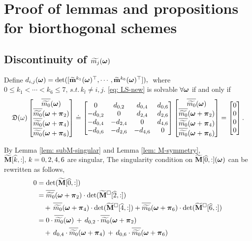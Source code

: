 \section{Proof of lemmas and propositions for biorthogonal schemes}\label{app: lemmas}

\subsection{Discontinuity of $\widetilde{m_{j}}(\boldsymbol{\omega})$}\label{app: discontinuity}
\begin{lemma}\label{lem: subM-singular-sys}
Define $d_{i,j}(\boldsymbol{\omega}) = \det([\widetilde{\mathbf{m}}^{k_1}(\boldsymbol{\omega})^\top,\cdots,\widetilde{\mathbf{m}}^{k_6}(\boldsymbol{\omega})^\top]),\;$ where $0\leq k_1<\cdots<k_6\leq 7,\, s.t.\, k_l\neq i,j.$
\eqref{eq: LS-new} is solvable $\forall \boldsymbol{\omega}$ if and only if \vspace{.5em}
\begin{align}
\label{eq: singular-cond}
\mathfrak{D}(\omega)\begin{bmatrix}
\sbarm{0}\\
\sbarmp{0}{2}\\
\sbarmp{0}{4}\\
\sbarmp{0}{6}
\end{bmatrix}
\doteq
\begin{bmatrix}
0 & d_{0,2} & d_{0,4} & d_{0,6}\\
-d_{0,2} & 0 & d_{2,4} & d_{2,6}\\
-d_{0,4} & -d_{2,4} & 0 & d_{4,6}\\
-d_{0,6} & -d_{2,6} & -d_{4,6} & 0
\end{bmatrix}
\begin{bmatrix}
\sbarm{0}\\
\sbarmp{0}{2}\\
\sbarmp{0}{4}\\
\sbarmp{0}{6}
\end{bmatrix}
= \begin{bmatrix}
0\\0\\0\\0
\end{bmatrix}.
\end{align}
\end{lemma}
By Lemma \ref{lem: subM-singular} and Lemma \ref{lem: M-symmetry},  $\widetilde{\mathbf{M}}[\widehat{k},:],\,k=0,2,4,6$ are singular,
The singularity condition on  $\widetilde{\mathbf{M}}[\widehat{0},:](\boldsymbol{\omega})$ can be rewritten as follows,
\begin{align}\label{eq: singular-omega}
0 &=\det(\M[\widehat{0},:]) \notag\\
&=  \sbarmp{0}{2}\cdot\det(\Msub[\widehat{2},:])\notag\\
&\quad+ \,\sbarmp{0}{4}\cdot\det(\Msub[\widehat{4},:])
+ \sbarmp{0}{6}\cdot\det(\Msub[\widehat{6},:])\notag\\
&= 0\cdot\sbarm{0}\,+\,d_{0,2}\cdot\sbarmp{0}{2} \notag\\
&\quad+\,d_{0,4}\cdot \sbarmp{0}{4}\,+\, d_{0,6}\cdot\sbarmp{0}{6}
\end{align}
